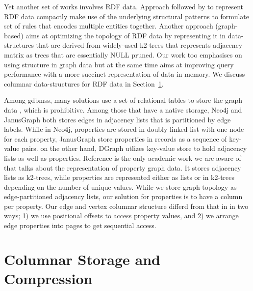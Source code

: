 Yet another set of works involves RDF data. Approach followed by \cite{comp-rdf, rbcomp, hdt} to represent RDF data compactly make use of the underlying structural patterns to formulate set of rules that encodes multiple entities together. Another approach (graph-based) aims at optimizing the topology of RDF data \cite{k2triples, ik2trees} by representing it in data-structures that are derived from widely-used k2-trees \cite{k2trees} that represents adjacency matrix as trees that are essentially NULL pruned. Our work too emphasises on using structure in graph data but at the same time aims at improving query performance with a more succinct representation of data in memory. We discuss columnar data-structures for RDF data in Section~\ref{column-storage}.

Among \gls{gdbms}s, many solutions use a set of relational tables to store the graph data \cite{hana-graph, oracle}, which is prohibitive. Among those that have a native storage, Neo4j \cite{neo4j} and JanusGraph \cite{janusgraph} both stores edges in adjacency lists that is partitioned by edge labels. While in Neo4j, properties are stored in doubly linked-list with one node for each property, JanusGraph store properties in records as a sequence of key-value pairs. on the other hand, DGraph \cite{dgraph} utlizes key-value store to hold adjacency lists as well as properties. Reference \cite{compact-rep-graph} is the only academic work we are aware of that talks about the representation of property graph data. It stores adjacency lists as k2-trees, while properties are represented either as lists or in k2-trees depending on the number of unique values. While we store graph topology as edge-partitioned adjacency lists, our solution for properties is to have a column per property. Our edge and vertex columnar structure differd from that in \cite{compact-rep-graph} in two ways; 1) we use positional offsets to access property values, and 2) we arrange edge properties into pages to get sequential access.

\section{Columnar Storage and Compression}
\label{column-storage}

